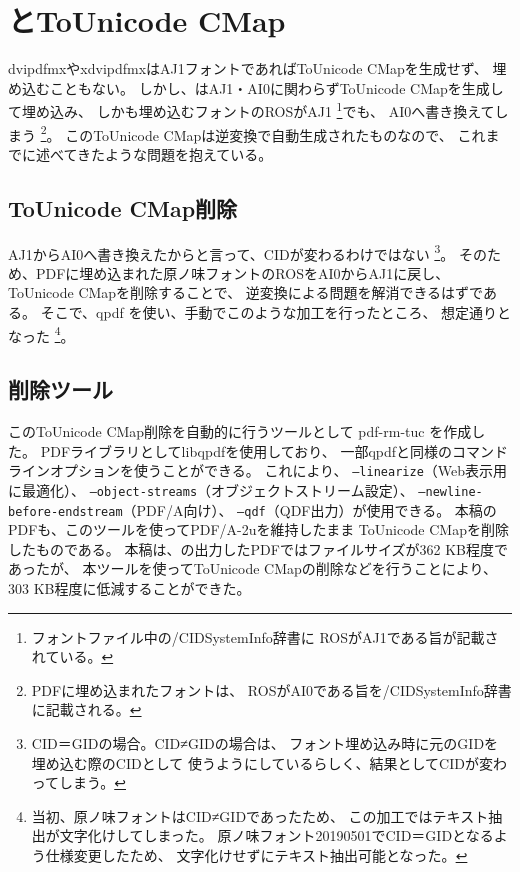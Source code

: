 \section{\LuaTeX とToUnicode CMap}

dvipdfmxやxdvipdfmxはAJ1フォントであればToUnicode CMapを生成せず、
埋め込むこともない。
しかし、\LuaTeX はAJ1・AI0に関わらずToUnicode CMapを生成して埋め込み、
しかも埋め込むフォントのROSがAJ1
\footnote{フォントファイル中の/CIDSystemInfo辞書に
  ROSがAJ1である旨が記載されている。}でも、
AI0へ書き換えてしまう
\footnote{PDFに埋め込まれたフォントは、
  ROSがAI0である旨を/CIDSystemInfo辞書に記載される。}。
このToUnicode CMapは逆変換で自動生成されたものなので、
これまでに述べてきたような問題を抱えている。

\subsection{ToUnicode CMap削除}

AJ1からAI0へ書き換えたからと言って、CIDが変わるわけではない
\footnote{CID＝GIDの場合。CID≠GIDの場合は、
  フォント埋め込み時に元のGIDを埋め込む際のCIDとして
  使うようにしているらしく、結果としてCIDが変わってしまう。}。
そのため、PDFに埋め込まれた原ノ味フォントのROSをAI0からAJ1に戻し、
ToUnicode CMapを削除することで、
逆変換による問題を解消できるはずである。
そこで、qpdf \cite{qpdf}を使い、手動でこのような加工を行ったところ、
想定通りとなった
\footnote{当初、原ノ味フォントはCID≠GIDであったため、
  この加工ではテキスト抽出が文字化けしてしまった。
  原ノ味フォント20190501でCID＝GIDとなるよう仕様変更したため、
  文字化けせずにテキスト抽出可能となった。}。

\subsection{削除ツール}

このToUnicode CMap削除を自動的に行うツールとして
pdf-rm-tuc \cite{pdf-rm-tuc}を作成した。
PDFライブラリとしてlibqpdfを使用しており、
一部qpdfと同様のコマンドラインオプションを使うことができる。
これにより、
\texttt{\textcompwordmark --linearize}（Web表示用に最適化）、
\texttt{\textcompwordmark --object-streams}（オブジェクトストリーム設定）、
\texttt{\textcompwordmark --newline-before-endstream}（PDF/A向け）、
\texttt{\textcompwordmark --qdf}（QDF出力）が使用できる。
本稿のPDFも、このツールを使ってPDF/A-2uを維持したまま
ToUnicode CMapを削除したものである。
本稿は、\LuaTeX の出力したPDFではファイルサイズが362 KB程度であったが、
本ツールを使ってToUnicode CMapの削除などを行うことにより、
303 KB程度に低減することができた。

